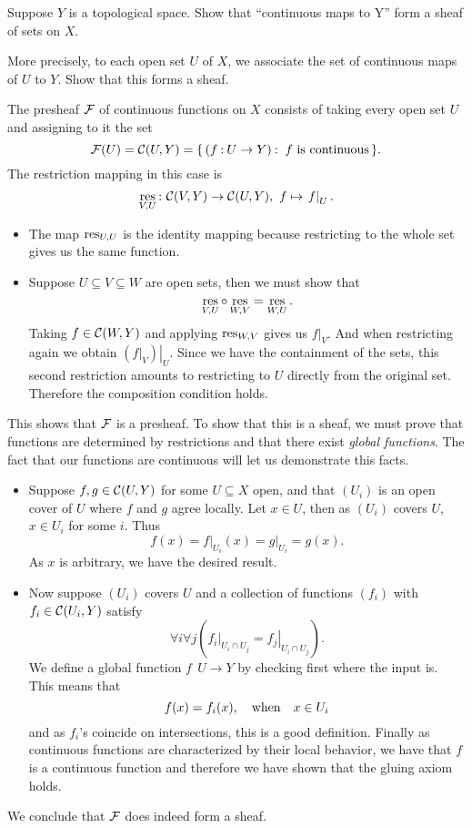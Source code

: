 \documentclass[12pt]{memoir}
\begin{document}
\begin{Ej}[2.2.F. Vakil]
    Suppose $Y$ is a topological space. Show that “continuous maps to Y” form a sheaf of sets on $X$.\par
    More precisely, to each open set $U$ of $X$, we associate the set of continuous maps of $U$ to $Y$. Show that this forms a sheaf.
\end{Ej}

\begin{ptcbr}
    The presheaf $\mathcal{F}$ of continuous functions on $X$ consists of taking every open set $U$ and assigning to it the set 
    $$\mathcal{F}(U)=\mathcal{C}(U,Y)=\{\,(f\mathbin{:} U\to Y)\mathbin{:}\ f\ \text{is continuous}\,\}.$$
    The restriction mapping in this case is 
    $$\operatorname*{res}_{V,U}\mathbin{:}\ \mathcal{C}(V,Y)\to\mathcal{C}(U,Y),\ f\mapsto \left.f\right\rvert_U.$$
    \begin{itemize}
        \itemsep=-0.4em
        \item The map $\operatorname*{res}_{U,U}$ is the identity mapping because restricting to the whole set gives us the same function.
        \item Suppose $U\subseteq V\subseteq W$ are open sets, then we must show that 
        $$\operatorname*{res}_{V,U}\circ\operatorname*{res}_{W,V}=\operatorname*{res}_{W,U}.$$
        Taking $f\in\mathcal{C}(W,Y)$ and applying $\operatorname*{res}_{W,V}$ gives us $\left.f\right\rvert_V$. And when restricting again we obtain $\left.\left(\left.f\right\rvert_V\right)\right\rvert_U$. Since we have the containment of the sets, this second restriction amounts to restricting to $U$ directly from the original set. Therefore the composition condition holds.
    \end{itemize}
    This shows that $\mathcal{F}$ is a presheaf. To show that this is a sheaf, we must prove that functions are determined by restrictions and that there exist \emph{global functions}. The fact that our functions are continuous will let us demonstrate this facts. 
    \begin{itemize}
        \itemsep=-0.4em
        \item Suppose $f,g\in\mathcal{C}(U,Y)$ for some $U\subseteq X$ open, and that $(U_i)$ is an open cover of $U$ where $f$ and $g$ agree locally. Let $x\in U$, then as $(U_i)$ covers $U$, $x\in U_i$ for some $i$. Thus 
        $$f(x)=\left.f\right\rvert_{U_i}(x)=\left.g\right\rvert_{U_i}=g(x).$$
        As $x$ is arbitrary, we have the desired result.
        \item Now suppose $(U_i)$ covers $U$ and a collection of functions $(f_i)$ with $f_i\in\mathcal{C}(U_i,Y)$ satisfy 
        $$\forall i\forall j\left(\left.f_i\right\rvert_{U_i\cap U_j}=\left.f_j\right\rvert_{U_i\cap U_j}\right).$$
        We define a global function $f\:\ U\to Y$ by checking first where the input is. This means that
        $$f(x)=f_i(x),\quad\text{when}\quad x\in U_i$$
        and as $f_i$'s coincide on intersections, this is a good definition. Finally as continuous functions are characterized by their local behavior, we have that $f$ is a continuous function and therefore we have shown that the gluing axiom holds.
    \end{itemize}
    We conclude that $\mathcal{F}$ does indeed form a sheaf.
\end{ptcbr}
\end{document}
